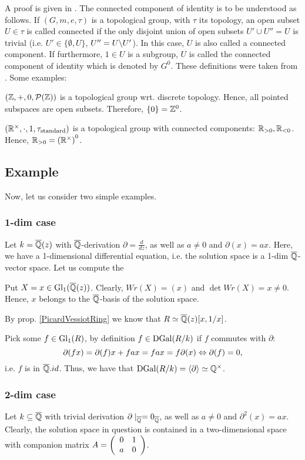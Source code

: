 \bmk A proof is given in \cite{vdPS01}. The connected component of identity is to be understood as follows. If $(G,m,e,\tau)$ is a topological group, with $\tau$ its topology, an open subset $U \in \tau$ is called connected if the only disjoint union of open subsets $U' \cup U'' = U$ is trivial (i.e. $U' \in \{\emptyset, U\}$, $U'' = U\bsl U'$). In this case, $U$ is also called a connected component. If furthermore, $1 \in U$ is a subgroup, $U$ is called the connected component of identity which is denoted by $G^0$. These definitions were taken from \cite{Milne}.
\bsp Some examples:
\bn
\item $(\zz,+,0,\mathcal{P}(\zz))$ is a topological group wrt. discrete topology. Hence, all pointed subspaces are open subsets. Therefore, $\{0\} = \zz^0$.
\item $(\rz^\times,\cdot,1,\tau_{\trm{standard}})$ is a topological group with connected components: $\rz_{>0}, \rz_{<0}$. Hence, $\rz_{>0} = \left(\rz^{\times}\right)^0$.
\en
\subsection{Example}
Now, let us consider two simple examples.
\subsubsection{1-dim case}
Let $k = \currfield(z)$ with $\currfield$-derivation $\partial = \frac{d}{d z}$, as well as $a \neq 0$ and $\partial(x) = ax$. Here, we have a 1-dimensional differential equation, i.e. the solution space is a 1-dim $\currfield$-vector space. Let us compute the
\bd
\item[Fundamental matrix] Put $X = x \in \trm{Gl}_1(\currfield(z))$. Clearly, $Wr(X) = (x)$ and $\det Wr(X) = x \neq 0$. Hence, $x$ belongs to the $\currfield$-basis of the solution space.
\item[Picard-Vessiot ring] By prop. \ref{PicardVessiotRing} we know that $R \simeq \currfield(z)[x,1/x]$.
\item[Differential Galois group] Pick some $f \in \trm{Gl}_1(R)$, by definition $f \in \trm{DGal}(R/k)$ if $f$ commutes with $\partial$:
$$\partial(f x) = \partial(f) x + f a x = f a x = f \partial(x) \LRA \partial(f) = 0,$$
i.e. $f$ is in $\currfield.id$. Thus, we have that $\trm{DGal}(R/k) = \left<\partial\right> \simeq \qz^\times$.
\ed
\subsubsection{2-dim case} \label{twoD}
Let $k \subseteq \currfield$ with trivial derivation $\partial\mid_{\currfield} = 0_{\currfield}$, as well as $a \neq 0$ and $\partial^2(x) = a x$. Clearly, the solution space in question is contained in a two-dimensional space with companion matrix $A = \left(\bao{cc}
0 & 1\\
a & 0\\
\ea\right)$.
